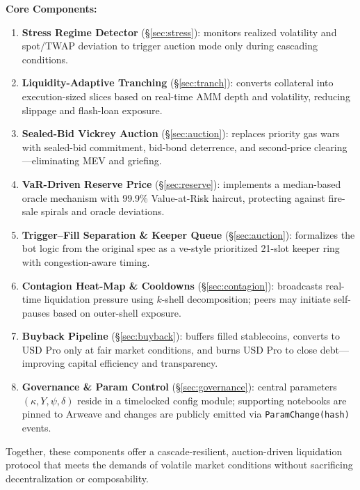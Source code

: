 \documentclass[11pt]{article}
\newcommand{\secref}[1]{§\hyperref[#1]{\ref*{#1}}}
\begin{document}
\vspace{1em}
\noindent
\textbf{Core Components:}
\begin{enumerate}[label=\textbf{\arabic*.},wide, labelindent=0pt]
  \item \textbf{Stress Regime Detector} (\secref{sec:stress}): monitors realized volatility and spot/TWAP deviation to trigger auction mode only during cascading conditions.

  \item \textbf{Liquidity-Adaptive Tranching} (\secref{sec:tranch}): converts collateral into execution-sized slices based on real-time AMM depth and volatility, reducing slippage and flash-loan exposure.

  \item \textbf{Sealed-Bid Vickrey Auction} (\secref{sec:auction}): replaces priority gas wars with sealed-bid commitment, bid-bond deterrence, and second-price clearing—eliminating MEV and griefing.

  \item \textbf{VaR-Driven Reserve Price} (\secref{sec:reserve}): implements a median-based oracle mechanism with 99.9\% Value-at-Risk haircut, protecting against fire-sale spirals and oracle deviations.

  \item \textbf{Trigger–Fill Separation \& Keeper Queue} (\secref{sec:auction}): formalizes the bot logic from the original spec as a ve-style prioritized 21-slot keeper ring with congestion-aware timing.

  \item \textbf{Contagion Heat-Map \& Cooldowns} (\secref{sec:contagion}): broadcasts real-time liquidation pressure using $k$-shell decomposition; peers may initiate self-pauses based on outer-shell exposure.

  \item \textbf{Buyback Pipeline} (\secref{sec:buyback}): buffers filled stablecoins, converts to USD Pro only at fair market conditions, and burns USD Pro to close debt—improving capital efficiency and transparency.
  \item \textbf{Governance \& Param Control} (\secref{sec:governance}): central parameters \((\kappa, Y, \psi, \delta)\) reside in a timelocked config module; supporting notebooks are pinned to Arweave and changes are publicly emitted via \texttt{ParamChange(hash)} events.

\end{enumerate}

\noindent
Together, these components offer a cascade-resilient, auction-driven liquidation protocol that meets the demands of volatile market conditions without sacrificing decentralization or composability.
\end{document}
